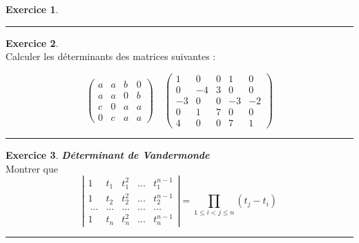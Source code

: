 \documentclass[a4paper,10pt]{article}
\theoremstyle{definition}
\theoremstyle{definition}
\newtheorem{exo}{Exercice}
\begin{document}
\begin{minipage}{1\linewidth}
\begin{minipage}[t]{0.48\linewidth}
\begin{exo}
			\centering
			\rule{1\linewidth}{0.6pt}
		\end{exo}
		
		\begin{exo}\quad\\
		Calculer les déterminants des matrices suivantes :
		
		$$
		\begin{pmatrix}
		a&a&b&0 \\  a&a&0&b \\  c&0&a&a \\ 0&c&a&a
		\end{pmatrix}
		\quad
		\begin{pmatrix}
		1&0&0&1&0 \\ 0&-4&3&0&0 \\ -3&0&0&-3&-2 \\ 0&1&7&0&0 \\ 4&0&0&7&1  
		\end{pmatrix}
		$$
			
			\centering
			\rule{1\linewidth}{0.6pt}
		\end{exo}
		
		\begin{exo} \textit{\textbf{Déterminant de Vandermonde}}\quad\\
		Montrer que
		$$\left|
		\begin{array}{ccccc}
		1 & t_1 & t_1^2 & \ldots & t_1^{n-1} \\
		1 & t_2 & t_2^2 & \ldots & t_2^{n-1} \\\
		\ldots&\ldots&\ldots& \ldots & \ldots \\
		1 & t_n & t_n^2 & \ldots & t_n^{n-1}
		\end{array}\right|
		= \prod_{1 \le i < j \le n} (t_j - t_i) $$
			
			\centering
			\rule{1\linewidth}{0.6pt}
		\end{exo}

		
		
		
		
		
	\end{minipage}
\end{minipage}
\end{document}
